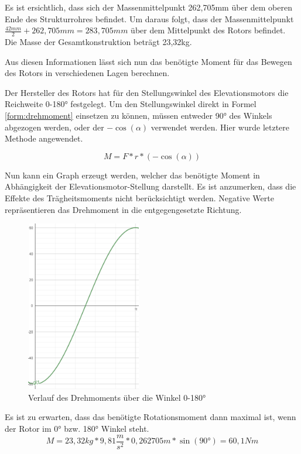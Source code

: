Es ist ersichtlich, dass sich der Massenmittelpunkt 262,705mm über dem oberen Ende des Strukturrohres befindet. Um daraus folgt, dass der Massenmittelpunkt $\frac{42mm}{2}+262,705mm=283,705mm$ über dem Mittelpunkt des Rotors befindet. Die Masse der Gesamtkonstruktion beträgt 23,32kg.

Aus diesen Informationen lässt sich nun das benötigte Moment für das Bewegen des Rotors in verschiedenen Lagen berechnen.

Der Hersteller des Rotors hat für den Stellungswinkel des Elevationsmotors die Reichweite 0-180° festgelegt. Um den Stellungswinkel direkt in Formel \ref{form:drehmoment} einsetzen zu können, müssen entweder 90° des Winkels abgezogen werden, oder der $-\cos(\alpha)$ verwendet werden. Hier wurde letztere Methode angewendet.

\begin{equation}
	M=F*r*(-\cos(\alpha))
\end{equation}

Nun kann ein Graph erzeugt werden, welcher das benötigte Moment in Abhängigkeit der Elevationsmotor-Stellung darstellt. Es ist anzumerken, dass die Effekte des Trägheitsmoments nicht berücksichtigt werden. Negative Werte repräsentieren das Drehmoment in die entgegengesetzte Richtung.

\begin{figure}[h!]
	\centering
	\includegraphics[width=5cm]{../ref/Rotationsmoment Elevation.png}
	\caption{Verlauf des Drehmoments über die Winkel 0-180°}
	\label{fig:verlauf-drehmoment}
\end{figure}

Es ist zu erwarten, dass das benötigte Rotationsmoment dann maximal ist, wenn der Rotor im 0° bzw. 180° Winkel steht. 
\begin{equation}
	M=23,32kg*9,81\frac{m}{s^2}*0,262705m*\sin(90°)=60,1Nm
\end{equation}

